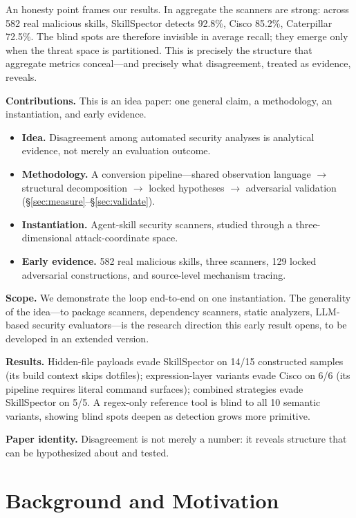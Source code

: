 \documentclass[sigconf,nonacm]{acmart}
\begin{document}
An honesty point frames our results.
In aggregate the scanners are strong: across 582 real malicious skills, SkillSpector detects 92.8\%, Cisco 85.2\%, Caterpillar 72.5\%.
The blind spots are therefore invisible in average recall; they emerge only when the threat space is partitioned.
This is precisely the structure that aggregate metrics conceal---and precisely what disagreement, treated as evidence, reveals.

\noindent\textbf{Contributions.} This is an idea paper: one general claim, a methodology, an instantiation, and early evidence.
\begin{itemize}
  \item \textbf{Idea.} Disagreement among automated security analyses is analytical evidence, not merely an evaluation outcome.
  \item \textbf{Methodology.} A conversion pipeline---shared observation language $\rightarrow$ structural decomposition $\rightarrow$ locked hypotheses $\rightarrow$ adversarial validation (\S\ref{sec:measure}--\S\ref{sec:validate}).
  \item \textbf{Instantiation.} Agent-skill security scanners, studied through a three-dimensional attack-coordinate space.
  \item \textbf{Early evidence.} 582 real malicious skills, three scanners, 129 locked adversarial constructions, and source-level mechanism tracing.
\end{itemize}

\noindent\textbf{Scope.} We demonstrate the loop end-to-end on one instantiation.
The generality of the idea---to package scanners, dependency scanners, static analyzers, LLM-based security evaluators---is the research direction this early result opens, to be developed in an extended version.

\noindent\textbf{Results.} Hidden-file payloads evade SkillSpector on 14/15 constructed samples (its build context skips dotfiles); expression-layer variants evade Cisco on 6/6 (its pipeline requires literal command surfaces); combined strategies evade SkillSpector on 5/5.
A regex-only reference tool is blind to all 10 semantic variants, showing blind spots deepen as detection grows more primitive.

\noindent\textbf{Paper identity.} Disagreement is not merely a number: it reveals structure that can be hypothesized about and tested.

\section{Background and Motivation}
\label{sec:background}
\end{document}
